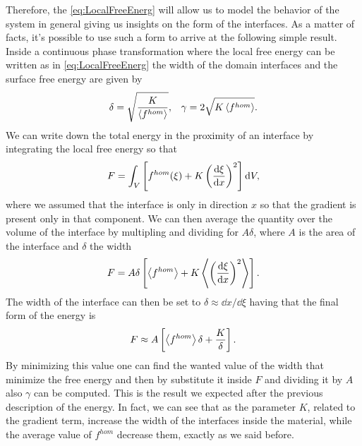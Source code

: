 Therefore, the \eqref{eq:LocalFreeEnerg} will allow us to model the behavior of the system in general giving us insights on the form of the interfaces. As a matter of facts, it's possible to use such a form to arrive at the following simple result.
{
    Inside a continuous phase transformation where the local free energy can be written as in \eqref{eq:LocalFreeEnerg} the width of the domain interfaces and the surface free energy are given by
    \begin{align}
        &\delta = \sqrt{\frac{K}{\left\langle f^{hom} \right\rangle}}, &\gamma = 2\sqrt{K\left\langle f^{hom} \right\rangle}.
    \end{align}
}
{
    We can write down the total energy in the proximity of an interface by integrating the local free energy so that
    \begin{equation}
        \label{eq:TotalFreeEnergyInter}
        F = \int_V \left[ f^{hom}(\xi) + K\left( \dv{\xi}{x} \right)^2 \right]\dd V,
    \end{equation}
    where we assumed that the interface is only in direction $x$ so that the gradient is present only in that component. We can then average the quantity over the volume of the interface by multipling and dividing for $A\delta$, where $A$ is the area of the interface and $\delta$ the width
    \begin{equation}
        F = A\delta\left[ \left\langle f^{hom} \right\rangle + K \left\langle \left( \dv{\xi}{x} \right)^2 \right\rangle \right].
    \end{equation}
    The width of the interface can then be set to $\delta \approx \dd x/\dd\xi$ having that the final form of the energy is
    \begin{equation}
        F \approx A\left[ \left\langle f^{hom} \right\rangle\delta + \frac{K}{\delta} \right].
    \end{equation}
    By minimizing this value one can find the wanted value of the width that minimize the free energy and then by substitute it inside $F$ and dividing it by $A$ also $\gamma$ can be computed.
}
\noindent
This is the result we expected after the previous description of the energy. In fact, we can see that as the parameter $K$, related to the gradient term, increase the width of the interfaces inside the material, while the average value of $f^{hom}$ decrease them, exactly as we said before.


